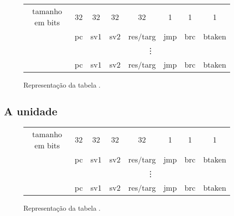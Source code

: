 \begin{figure}
	\label{Fig:MemoTableG}
	\caption[Representação da tabela \tableg]{
		Representação da tabela \tableg.}
	\begin{center}
		\newcommand{\tabela}[1]{
			\multicolumn{1}{|c|}{#1}
		}
		\begin{tabular}{*{8}{c}}
			tamanho em bits & 32 & 32 & 32 & 32 & 1 & 1 & 1 \\
			\cline{2-8}
			& \tabela{pc} & \tabela{sv1} & \tabela{sv2} & \tabela{res/targ} & \tabela{jmp} & \tabela{brc} & \tabela{btaken} \\
			\cline{2-8}
			& \multicolumn{7}{c}{\vdots} \\
			\cline{2-8}
			& \tabela{pc} & \tabela{sv1} & \tabela{sv2} & \tabela{res/targ} & \tabela{jmp} & \tabela{brc} & \tabela{btaken} \\
			\cline{2-8}
		\end{tabular}
	\end{center}
\end{figure}

\subsection{A unidade \tablet}
\label{Fundamentacao:DTMHardware:TableT}

\begin{figure}
	\label{Fig:MemoTableG}
	\caption[Representação da tabela \tablet]{
		Representação da tabela \tablet.}
	\begin{center}
		\newcommand{\tabela}[1]{
			\multicolumn{1}{|c|}{#1}
		}
		\begin{tabular}{*{8}{c}}
			tamanho em bits & 32 & 32 & 32 & 32 & 1 & 1 & 1 \\
			\cline{2-8}
			& \tabela{pc} & \tabela{sv1} & \tabela{sv2} & \tabela{res/targ} & \tabela{jmp} & \tabela{brc} & \tabela{btaken} \\
			\cline{2-8}
			& \multicolumn{7}{c}{\vdots} \\
			\cline{2-8}
			& \tabela{pc} & \tabela{sv1} & \tabela{sv2} & \tabela{res/targ} & \tabela{jmp} & \tabela{brc} & \tabela{btaken} \\
			\cline{2-8}
		\end{tabular}
	\end{center}
\end{figure}


